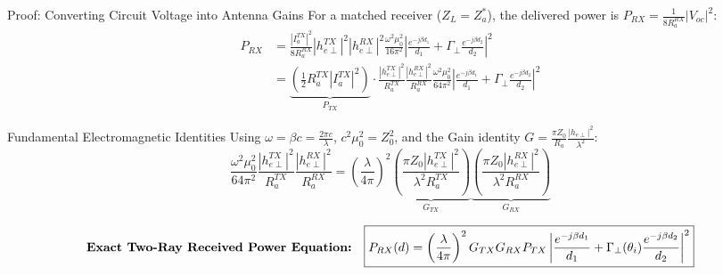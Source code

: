 \documentclass[aspectratio=169, 10pt]{beamer}
\begin{document}
\begin{frame}{Proof: Converting Circuit Voltage into Antenna Gains}
\small
    For a matched receiver ($Z_L = Z_a^*$), the delivered power is $P_{RX} = \frac{1}{8 R_a^{RX}} |V_{oc}|^2$:
    \begin{align}
        P_{RX} &= \frac{|I_a^{TX}|^2}{8 R_a^{RX}} |h_{e\perp}^{TX}|^2 |h_{e\perp}^{RX}|^2 \frac{\omega^2 \mu_0^2}{16\pi^2} \left| \frac{e^{-j\beta d_1}}{d_1} + \Gamma_\perp \frac{e^{-j\beta d_2}}{d_2} \right|^2 \nonumber \\
        &= \underbrace{\left(\frac{1}{2} R_a^{TX} |I_a^{TX}|^2\right)}_{P_{TX}} \cdot \frac{|h_{e\perp}^{TX}|^2}{R_a^{TX}} \frac{|h_{e\perp}^{RX}|^2}{R_a^{RX}} \frac{\omega^2 \mu_0^2}{64\pi^2} \left| \frac{e^{-j\beta d_1}}{d_1} + \Gamma_\perp \frac{e^{-j\beta d_2}}{d_2} \right|^2
    \end{align}
\vspace{-1em}
    \begin{block}{Fundamental Electromagnetic Identities}
        Using $\omega = \beta c = \frac{2\pi c}{\lambda}$, $c^2 \mu_0^2 = Z_0^2$, and the Gain identity $G = \frac{\pi Z_0}{R_a} \frac{|h_{e\perp}|^2}{\lambda^2}$:
        \begin{equation}
            \frac{\omega^2 \mu_0^2}{64\pi^2} \frac{|h_{e\perp}^{TX}|^2}{R_a^{TX}} \frac{|h_{e\perp}^{RX}|^2}{R_a^{RX}} 
            = \left(\frac{\lambda}{4\pi}\right)^2 \underbrace{\left(\frac{\pi Z_0 |h_{e\perp}^{TX}|^2}{\lambda^2 R_a^{TX}}\right)}_{G_{TX}} \underbrace{\left(\frac{\pi Z_0 |h_{e\perp}^{RX}|^2}{\lambda^2 R_a^{RX}}\right)}_{G_{RX}}
        \end{equation}
    \end{block}

    \vspace{-1.5em}
    \begin{equation}
        \text{\textbf{Exact Two-Ray Received Power Equation:}}\quad \boxed{P_{RX}(d) = \left(\frac{\lambda}{4\pi}\right)^2 G_{TX} G_{RX} P_{TX} \left| \frac{e^{-j\beta d_1}}{d_1} + \Gamma_\perp(\theta_i) \frac{e^{-j\beta d_2}}{d_2} \right|^2}
    \end{equation}
\end{frame}
\end{document}
